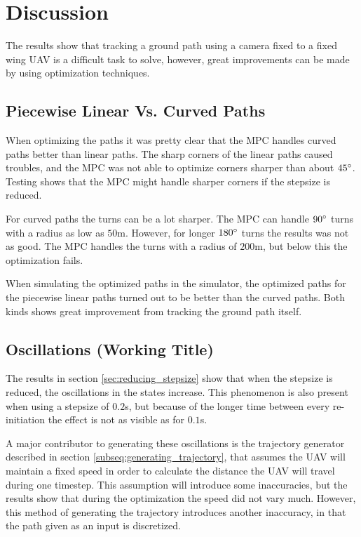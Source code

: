 \chapter{Discussion}

The results show that tracking a ground path using a camera fixed to a fixed wing UAV is a difficult task to solve, however, great improvements can be made by using optimization techniques.


\section{Piecewise Linear Vs. Curved Paths}

When optimizing the paths it was pretty clear that the MPC handles curved paths better than linear paths. The sharp corners of the linear paths caused troubles, and the MPC was not able to optimize corners sharper than about $45\degree$. Testing shows that the MPC might handle sharper corners if the stepsize is reduced.

For curved paths the turns can be a lot sharper. The MPC can handle $90\degree$ turns with a radius as low as $50$m. However, for longer $180\degree$ turns the results was not as good. The MPC handles the turns with a radius of $200$m, but below this the optimization fails.

When simulating the optimized paths in the simulator, the optimized paths for the piecewise linear paths turned out to be better than the curved paths. Both kinds shows great improvement from tracking the ground path itself.


\section{Oscillations (Working Title)}

The results in section \ref{sec:reducing_stepsize} show that when the stepsize is reduced, the oscillations in the states increase. This phenomenon is also present when using a stepsize of $0.2$s, but because of the longer time between every re-initiation the effect is not as visible as for $0.1$s.

A major contributor to generating these oscillations is the trajectory generator described in section \ref{subseq:generating_trajectory}, that assumes the UAV will maintain a fixed speed in order to calculate the distance the UAV will travel during one timestep. This assumption will introduce some inaccuracies, but the results show that during the optimization the speed did not vary much. However, this method of generating the trajectory introduces another inaccuracy, in that the path given as an input is discretized.

